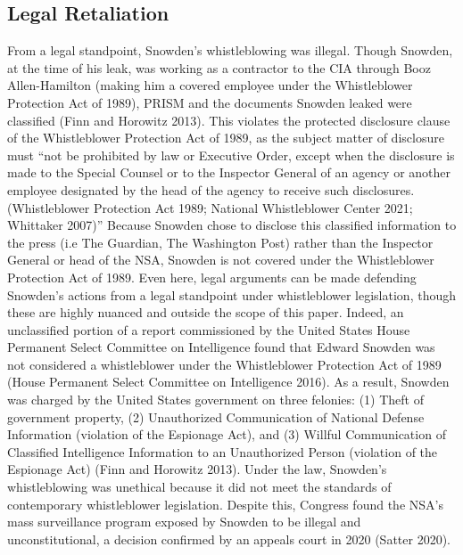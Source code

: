 \documentclass [12 pt] {article}
\begin{document}
\subsection {Legal Retaliation}
From a legal standpoint, Snowden's whistleblowing was illegal. Though Snowden, at the time of his leak, was working as a contractor to the CIA through Booz Allen-Hamilton (making him a covered employee under the Whistleblower Protection Act of 1989), PRISM and the documents Snowden leaked were classified (Finn and Horowitz 2013). This violates the protected disclosure clause of the Whistleblower Protection Act of 1989, as the subject matter of disclosure must ``not be prohibited by law or Executive Order, except when the disclosure is made to the Special Counsel or to the Inspector General of an agency or another employee designated by the head of the agency to receive such disclosures. (Whistleblower Protection Act 1989; National Whistleblower Center 2021; Whittaker 2007)'' Because Snowden chose to disclose this classified information to the press (i.e The Guardian, The Washington Post) rather than the Inspector General or head of the NSA, Snowden is not covered under the Whistleblower Protection Act of 1989. Even here, legal arguments can be made defending Snowden's actions from a legal standpoint under whistleblower legislation, though these are highly nuanced and outside the scope of this paper. Indeed, an unclassified portion of a report commissioned by the United States House Permanent Select Committee on Intelligence found that Edward Snowden was not considered a whistleblower under the Whistleblower Protection Act of 1989 (House Permanent Select Committee on Intelligence 2016).
\bigbreak
As a result, Snowden was charged by the United States government on three felonies: (1) Theft of government property, (2) Unauthorized Communication of National Defense Information (violation of the Espionage Act), and (3) Willful Communication of Classified Intelligence Information to an Unauthorized Person (violation of the Espionage Act) (Finn and Horowitz 2013). Under the law, Snowden's whistleblowing was unethical because it did not meet the standards of contemporary whistleblower legislation. Despite this, Congress found the NSA's mass surveillance program exposed by Snowden to be illegal and unconstitutional, a decision confirmed by an appeals court in 2020 (Satter 2020). 
\end{document}

